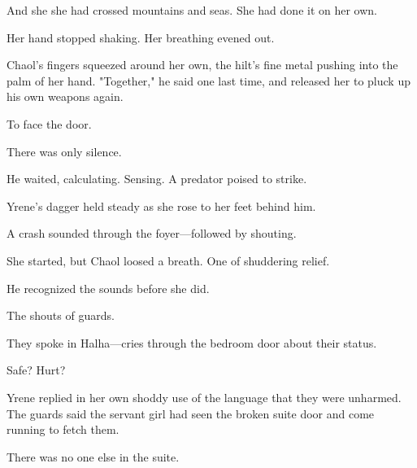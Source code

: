 And she  she had crossed mountains and seas. She had done it on her own.

Her hand stopped shaking. Her breathing evened out.

Chaol's fingers squeezed around her own, the hilt's fine metal pushing into the palm of her hand. "Together," he said one last time, and released her to pluck up his own weapons again.

To face the door.

There was only silence.

He waited, calculating. Sensing. A predator poised to strike.

Yrene's dagger held steady as she rose to her feet behind him.

A crash sounded through the foyer---followed by shouting.

She started, but Chaol loosed a breath. One of shuddering relief.

He recognized the sounds before she did.

The shouts of guards.

They spoke in Halha---cries through the bedroom door about their status.

Safe? Hurt?

Yrene replied in her own shoddy use of the language that they were unharmed. The guards said the servant girl had seen the broken suite door and come running to fetch them.

There was no one else in the suite.

